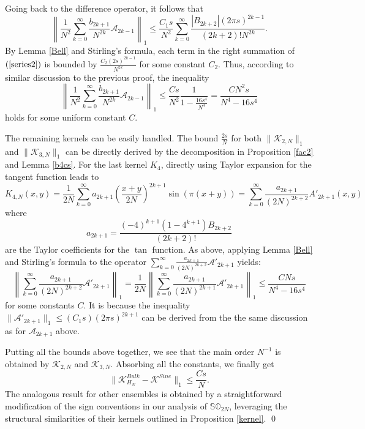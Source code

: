 \documentclass[11pt]{article}
\numberwithin{equation}{section}%
\numberwithin{theorem}{section}
\begin{document}
Going back to the difference operator, it follows that
\begin{equation}\label{series2}
    \left\|\frac{1}{N^2}\sum_{k=0}^\infty\frac{b_{2k+1}}{N^{2k}}\mathcal{A}_{2k-1}\right\|_1\le\frac{C_1s}{N^2}\sum_{k=0}^\infty\frac{|B_{2k+2}|(2\pi s)^{2k-1}}{(2k+2)!N^{2k}}.
\end{equation}
By Lemma \ref{Bell} and Stirling's formula, each term in the right summation of $(\ref{series2})$ is bounded by $\frac{C_2(2s)^{2k-1}}{N^{2k}}$ for some constant $C_2$. Thus, according to similar discussion to the previous proof, the inequality
\begin{equation*}
 \left\|\frac{1}{N^2}\sum_{k=0}^\infty\frac{b_{2k+1}}{N^{2k}}\mathcal{A}_{2k-1}\right\|_1\le\frac{Cs}{N^2}\frac{1}{1-\frac{16s^4}{N^4}}=\frac{CN^2s}{N^4-16s^4}
\end{equation*}
holds for some uniform constant $C$.

The remaining kernels can be easily handled. The bound $\frac{2s}{N}$ for both $\|\mathcal{K}_{2,N}\|_1$ and $\|\mathcal{K}_{3,N}\|_1$ can be directly derived by the decomposition in Proposition \ref{fac2} and Lemma \ref{b4cs}.
For the last kernel $K_4$, directly using Taylor expansion for the tangent function leads to
\begin{equation*}
    K_{4,N}(x,y)=\frac{1}{2N}\sum_{k=0}^\infty a_{2k+1}\left(\frac{x+y}{2N}\right)^{2k+1}\sin\left(\pi(x+y)\right)=\sum_{k=0}^\infty\frac{a_{2k+1}}{(2N)^{2k+2}}A'_{2k+1}(x,y)
\end{equation*}
where 
\begin{equation*}
    a_{2k+1}=\frac{(-4)^{k+1}(1-4^{k+1})B_{2k+2}}{(2k+2)!}
\end{equation*}
are the Taylor coefficients for the $\tan$ function. As above, applying Lemma \ref{Bell} and Stirling's formula to the operator
    $\sum\limits_{k=0}^\infty\frac{a_{2k+1}}{(2N)^{2k+2}}\mathcal{A}'_{2k+1}$
yields:
\begin{equation*}
    \left\|\sum_{k=0}^\infty\frac{a_{2k+1}}{(2N)^{2k+2}}\mathcal{A}'_{2k+1}\right\|_1=\frac{1}{2N}\left\|\sum_{k=0}^\infty\frac{a_{2k+1}}{(2N)^{2k+1}}\mathcal{A}'_{2k+1}\right\|_1\le\frac{CNs}{N^4-16s^4}
\end{equation*}
for some constants $C$. It is because the inequality $\|\mathcal{A}'_{2k+1}\|_1\le(C_1s)(2\pi s)^{2k+1}$ can be derived from the the same discussion as for $\mathcal{A}_{2k+1}$ above.

Putting all the bounds above together, we see that the main order $N^{-1}$ is obtained by $\mathcal{K}_{2,N}$ and $\mathcal{K}_{3,N}$. Absorbing all the constants, we finally get
\begin{equation*}
    \|\mathcal{K}_{H_N}^{Bulk}-\mathcal{K}^{Sine}\|_1\le\frac{Cs}{N}.
\end{equation*}
The analogous result for other ensembles is obtained by a straightforward modification of the sign conventions in our analysis of $\mathbb{SO}_{2N}$, leveraging the structural similarities of their kernels outlined in Proposition \ref{kernel}.
\qed
\end{document}
